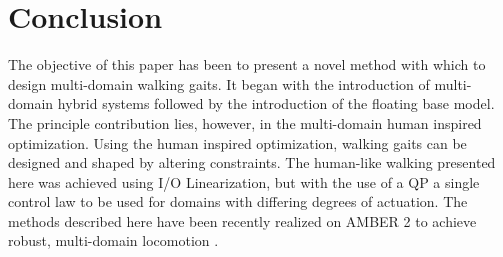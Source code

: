 \section{Conclusion}

The objective of this paper has been to present a novel method with which to design multi-domain walking gaits. It began with the introduction of multi-domain hybrid systems followed by the introduction of the floating base model. The principle contribution lies, however, in the multi-domain human inspired optimization. Using the human inspired optimization, walking gaits can be designed and shaped by altering constraints. The human-like walking presented here was achieved using I/O Linearization, but with the use of a QP a single control law to be used for domains with differing degrees of actuation. The methods described here have been recently realized on AMBER 2 to achieve robust, multi-domain locomotion \cite{url:AMBER2_MultiContact}.
